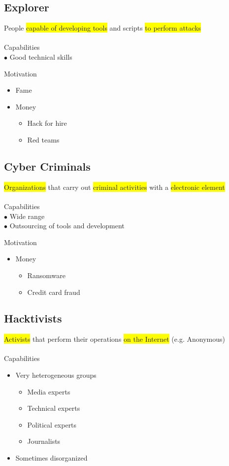 \documentclass[tikz,border=10pt]{project_plan}
\newcommand{\bulletPoint}{\hspace{-3.1pt}$\bullet$ \hspace{5pt}}
\begin{document}
\subsection{Explorer}
People \colorbox{yellow}{capable of developing tools} and scripts \colorbox{yellow}{to perform attacks}\\\\
Capabilities\\
\bulletPoint Good technical skills

Motivation
\begin{itemize}
  \item Fame
  \item Money
        \begin{itemize}
          \item Hack for hire
          \item Red teams
        \end{itemize}
\end{itemize}

\subsection{Cyber Criminals}
\colorbox{yellow}{Organizations} that carry out \colorbox{yellow}{criminal activities} with a \colorbox{yellow}{electronic element}\\\\
Capabilities\\
\bulletPoint Wide range\\
\bulletPoint Outsourcing of tools and development

Motivation
\begin{itemize}
  \item Money
        \begin{itemize}
          \item Ransomware
          \item Credit card fraud
        \end{itemize}
\end{itemize}

\subsection{Hacktivists}
\colorbox{yellow}{Activists} that perform their operations \colorbox{yellow}{on the Internet} (e.g. Anonymous)\\\\
Capabilities
\begin{itemize}
  \item Very heterogeneous groups
        \begin{itemize}
          \item Media experts
          \item Technical experts
          \item Political experts
          \item Journalists
        \end{itemize}
  \item Sometimes disorganized
\end{itemize}
\end{document}
